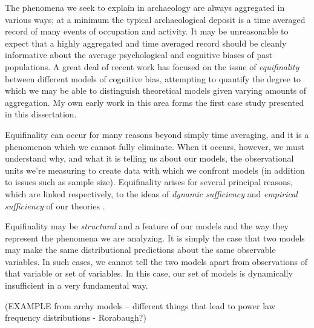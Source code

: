 The phenomena we seek to explain in archaeology are always aggregated in various ways; at a minimum the typical archaeological deposit is a time averaged record of many events of occupation and activity.  It may be unreasonable to expect that a highly aggregated and time averaged record should be cleanly informative about the average psychological and cognitive biases of past populations.  A great deal of recent work has focused on the issue of \textit{equifinality} between different models of cognitive bias, attempting to quantify the degree to which we may be able to distinguish theoretical models given varying amounts of aggregation.  My own early work in this area forms the first case study presented in this dissertation.

Equifinality can occur for many reasons beyond simply time averaging, and it is a phenomenon which we cannot fully eliminate.  When it occurs, however, we must understand why, and what it is telling us about our models, the observational units we're measuring to create data with which we confront models (in addition to issues such as sample size).  Equifinality arises for several principal reasons, which are linked respectively, to the ideas of \textit{dynamic sufficiency} and \textit{empirical sufficiency} of our theories \citep{Lewontin1974}.

Equifinality may be \textit{structural} and a feature of our models and the way they represent the phenomena we are analyzing.  It is simply the case that two models may make the same distributional predictions about the same observable variables.  In such cases, we cannot tell the two models apart from observations of that variable or set of variables.  In this case, our set of models is dynamically insufficient in a very fundamental way. 

(EXAMPLE from archy models -- different things that lead to power law frequency distributions - Rorabaugh?)


